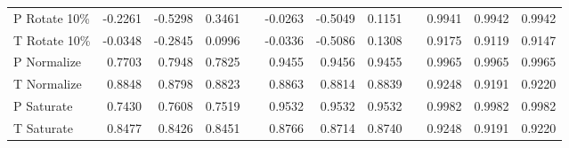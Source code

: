 \documentclass[english,12pt,a4paper,pdftex,elec,utf8, table]{aaltothesis}
\begin{document}
\begin{table}
\begin{center}
\begin{tabular}{@{}lrrrrrrrrrrr@{}}
 P Rotate 10\%  & -0.2261 & -0.5298 & 0.3461 &\phantom{abc} & -0.0263& -0.5049 & 0.1151 &\phantom{abc} & 0.9941 & 0.9942 & 0.9942\\
 T Rotate 10\%  & -0.0348 & -0.2845 & 0.0996 &\phantom{abc} & -0.0336 & -0.5086 & 0.1308 &\phantom{abc} & 0.9175 & 0.9119 & 0.9147 \\
 P Normalize    & 0.7703 & 0.7948 & 0.7825 & \phantom{abc} & 0.9455 & 0.9456& 0.9455 &\phantom{abc} & 0.9965 & 0.9965 & 0.9965\\
 T Normalize    & 0.8848 & 0.8798 & 0.8823 &\phantom{abc} & 0.8863 & 0.8814& 0.8839&\phantom{abc} & 0.9248 & 0.9191 & 0.9220 \\
 P Saturate     & 0.7430 & 0.7608 & 0.7519 &\phantom{abc} & 0.9532 & 0.9532 & 0.9532&\phantom{abc} & 0.9982 & 0.9982& 0.9982\\
 T Saturate     & 0.8477 & 0.8426 & 0.8451 &\phantom{abc} & 0.8766& 0.8714 & 0.8740 &\phantom{abc} & 0.9248 & 0.9191 & 0.9220\\
    \bottomrule
\end{tabular}
\end{center}\end{table}
\end{document}
